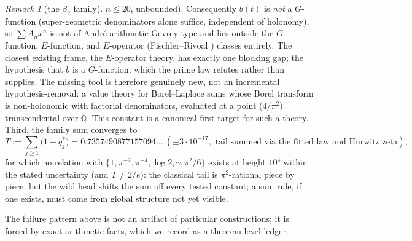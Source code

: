 \documentclass[11pt]{article}
\theoremstyle{plain}
\theoremstyle{definition}
\theoremstyle{remark}
\newtheorem{remark}[theorem]{Remark}
\newcommand{\Q}{\mathbb{Q}}
\begin{document}
\begin{remark}[the $\beta_2$ family]
$n\le20$, unbounded). Consequently $b(t)$ is \emph{not} a $G$-function (super-geometric denominators
alone suffice, independent of holonomy), so $\sum A_nx^n$ is not of Andr\'e arithmetic-Gevrey type \cite{Andre2000}
and lies outside the $G$-function, $E$-function, and $E$-operator (Fischler--Rivoal
\cite{FischlerRivoal2016}) classes
entirely. The closest existing frame, the $E$-operator theory, has exactly one blocking gap; the
hypothesis that $b$ is a $G$-function; which the prime law refutes rather than supplies.
The missing tool is therefore genuinely new, not an incremental hypothesis-removal: a value theory
for Borel--Laplace sums whose Borel transform is non-holonomic with factorial denominators,
evaluated at a point ($4/\pi^2$) transcendental over $\Q$. This constant is a canonical first target
for such a theory. Third, the family sum
converges to
\[
   T:=\sum_{j\ge1}\bigl(1-q^\ast_j\bigr)=0.7357490877157094\ldots\ (\pm3\cdot10^{-17},
   \text{ tail summed via the fitted law and Hurwitz zeta}),
\]
for which no relation with $\{1,\pi^{-2},\pi^{-4},\log2,\gamma,\pi^2/6\}$ exists at height
$10^4$ within the stated uncertainty (and $T\ne2/e$): the classical tail is $\pi^2$-rational
piece by piece, but the wild head shifts the sum off every tested constant; a sum rule, if one
exists, must come from global structure not yet visible.
\end{remark}

The failure pattern above is not an artifact of particular constructions; it is forced by exact
arithmetic facts, which we record as a theorem-level ledger.
\end{document}

